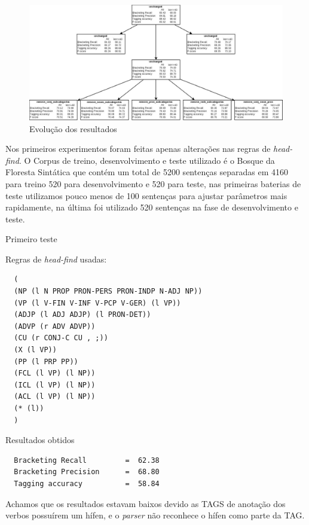 

\begin{figure}
	\begin{center}
		\includegraphics[scale=0.35]{diagrama_experimentos2.jpeg}
		\caption{\label{evolucao} Evolução dos resultados }		
	\end{center}
\end{figure}


Nos primeiros experimentos foram feitas apenas alterações nas regras de \emph{head-find}. O Corpus de treino, desenvolvimento e teste utilizado é o Bosque da Floresta Sintática que contém um total de 5200 sentenças separadas em 4160 para treino 520 para desenvolvimento e 520 para teste, nas primeiras baterias de teste utilizamos pouco menos de 100 sentenças para ajustar parâmetros mais rapidamente, na última foi utilizado 520 sentenças na fase de desenvolvimento e teste.

Primeiro teste

Regras de \emph{head-find} usadas:

\scriptsize
\begin{verbatim}
  (
  (NP (l N PROP PRON-PERS PRON-INDP N-ADJ NP))
  (VP (l V-FIN V-INF V-PCP V-GER) (l VP))
  (ADJP (l ADJ ADJP) (l PRON-DET))
  (ADVP (r ADV ADVP))
  (CU (r CONJ-C CU , ;))
  (X (l VP))
  (PP (l PRP PP))
  (FCL (l VP) (l NP))
  (ICL (l VP) (l NP))
  (ACL (l VP) (l NP))
  (* (l))
  )
\end{verbatim}

Resultados obtidos

\begin{verbatim}
  Bracketing Recall         =  62.38
  Bracketing Precision      =  68.80
  Tagging accuracy          =  58.84
\end{verbatim}

\normalsize
Achamos que os resultados estavam baixos devido as TAGS de anotação dos verbos possuírem um hífen, e o \emph{parser} não reconhece o hífen como parte da TAG.

